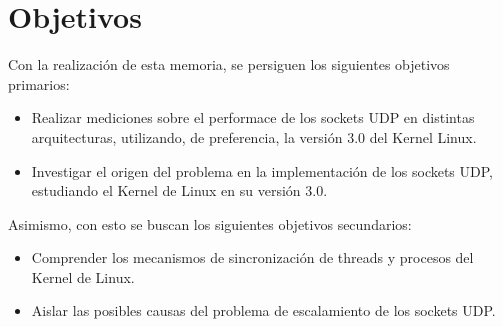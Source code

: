 \documentclass[12pt,spanish,letterpaper]{article}
\begin{document}
\section{Objetivos}
\par Con la realización de esta memoria, se persiguen los siguientes objetivos primarios:
\begin{itemize}
	\item Realizar mediciones sobre el performace de los sockets UDP en distintas arquitecturas, utilizando, de preferencia, la versión 3.0 del Kernel Linux.
	\item Investigar el origen del problema en la implementación de los sockets UDP, estudiando el Kernel de Linux en su versión 3.0.
\end{itemize}
\par Asimismo, con esto se buscan los siguientes objetivos secundarios:
\begin{itemize}
	\item Comprender los mecanismos de sincronización de threads y procesos del Kernel de Linux.
	\item Aislar las posibles causas del problema de escalamiento de los sockets UDP.
\end{itemize}
\end{document}
